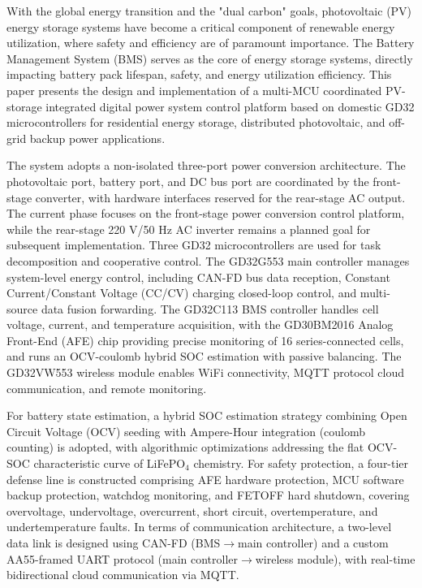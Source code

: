 With the global energy transition and the "dual carbon" goals, photovoltaic (PV) energy storage systems have become a critical component of renewable energy utilization, where safety and efficiency are of paramount importance. The Battery Management System (BMS) serves as the core of energy storage systems, directly impacting battery pack lifespan, safety, and energy utilization efficiency. This paper presents the design and implementation of a multi-MCU coordinated PV-storage integrated digital power system control platform based on domestic GD32 microcontrollers for residential energy storage, distributed photovoltaic, and off-grid backup power applications.

The system adopts a non-isolated three-port power conversion architecture. The photovoltaic port, battery port, and DC bus port are coordinated by the front-stage converter, with hardware interfaces reserved for the rear-stage AC output. The current phase focuses on the front-stage power conversion control platform, while the rear-stage 220 V/50 Hz AC inverter remains a planned goal for subsequent implementation. Three GD32 microcontrollers are used for task decomposition and cooperative control. The GD32G553 main controller manages system-level energy control, including CAN-FD bus data reception, Constant Current/Constant Voltage (CC/CV) charging closed-loop control, and multi-source data fusion forwarding. The GD32C113 BMS controller handles cell voltage, current, and temperature acquisition, with the GD30BM2016 Analog Front-End (AFE) chip providing precise monitoring of 16 series-connected cells, and runs an OCV-coulomb hybrid SOC estimation with passive balancing. The GD32VW553 wireless module enables WiFi connectivity, MQTT protocol cloud communication, and remote monitoring.

For battery state estimation, a hybrid SOC estimation strategy combining Open Circuit Voltage (OCV) seeding with Ampere-Hour integration (coulomb counting) is adopted, with algorithmic optimizations addressing the flat OCV-SOC characteristic curve of LiFePO$_4$ chemistry. For safety protection, a four-tier defense line is constructed comprising AFE hardware protection, MCU software backup protection, watchdog monitoring, and FETOFF hard shutdown, covering overvoltage, undervoltage, overcurrent, short circuit, overtemperature, and undertemperature faults. In terms of communication architecture, a two-level data link is designed using CAN-FD (BMS$\rightarrow$main controller) and a custom AA55-framed UART protocol (main controller$\rightarrow$wireless module), with real-time bidirectional cloud communication via MQTT.

